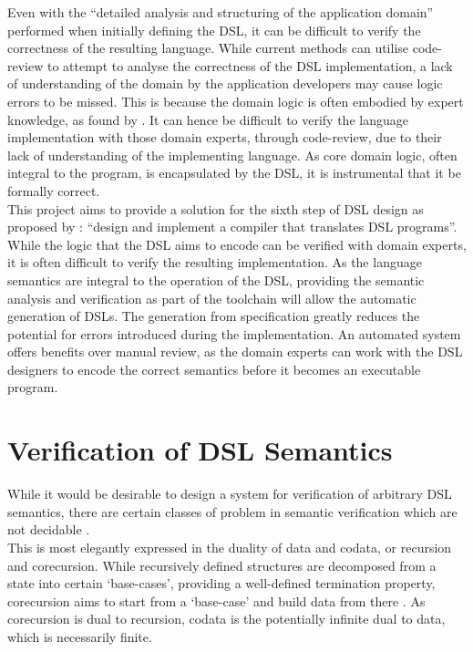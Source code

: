 Even with the ``detailed analysis and structuring of the application domain'' \citep{van2000domain} performed when initially defining the DSL, it can be difficult to verify the correctness of the resulting language. 
While current methods can utilise code-review to attempt to analyse the correctness of the DSL implementation, a lack of understanding of the domain by the application developers may cause logic errors to be missed. 
This is because the domain logic is often embodied by expert knowledge, as found by \cite{studer1998knowledge}. 
It can hence be difficult to verify the language implementation with those domain experts, through code-review, due to their lack of understanding of the implementing language.
As core domain logic, often integral to the program, is encapsulated by the DSL, it is instrumental that it be formally correct.\\

This project aims to provide a solution for the sixth step of DSL design as proposed by \cite{van2000domain}: ``design and implement a compiler that translates DSL programs''. 
While the logic that the DSL aims to encode can be verified with domain experts, it is often difficult to verify the resulting implementation.
As the language semantics are integral to the operation of the DSL, providing the semantic analysis and verification as part of the toolchain will allow the automatic generation of DSLs.
The generation from specification greatly reduces the potential for errors introduced during the implementation.
An automated system offers benefits over manual review, as the domain experts can work with the DSL designers to encode the correct semantics before it becomes an executable program.


\section{Verification of DSL Semantics} %
\label{sec:verification_of_dsl_semantics}
While it would be desirable to design a system for verification of arbitrary DSL semantics, there are certain classes of problem in semantic verification which are not decidable \citep{abdulla1994undecidable}. \\

This is most elegantly expressed in the duality of data and codata, or recursion and corecursion. 
While recursively defined structures are decomposed from a state into certain `base-cases', providing a well-defined termination property, corecursion aims to start from a `base-case' and build data from there \citep{hinze2010reasoning}.
As corecursion is dual to recursion, codata is the potentially infinite dual to data, which is necessarily finite. \\

